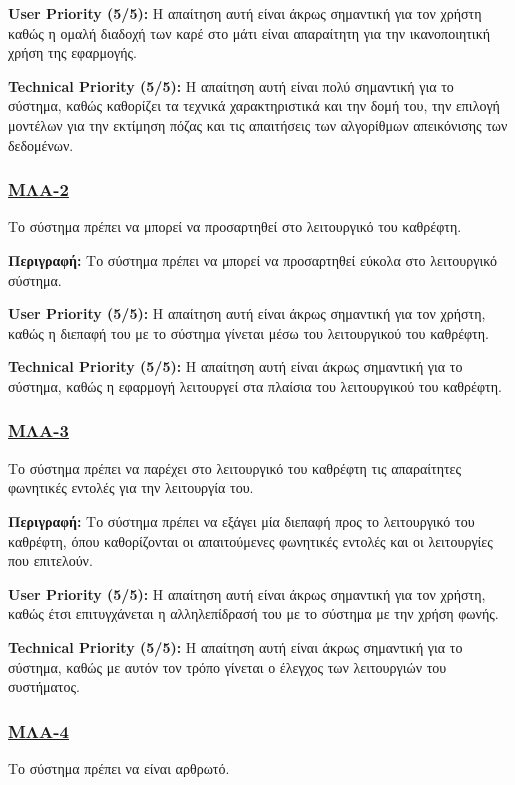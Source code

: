 \noindent\textbf{User Priority (5/5):} Η απαίτηση αυτή είναι άκρως σημαντική για τον χρήστη καθώς η ομαλή διαδοχή των καρέ στο μάτι είναι απαραίτητη για την ικανοποιητική χρήση της εφαρμογής.

\noindent\textbf{Technical Priority (5/5):} Η απαίτηση αυτή είναι πολύ σημαντική για το σύστημα, καθώς καθορίζει τα τεχνικά χαρακτηριστικά και την δομή του, την επιλογή μοντέλων για την εκτίμηση πόζας και τις απαιτήσεις των αλγορίθμων απεικόνισης των δεδομένων.

\subsubsection{\underline{ΜΛΑ-2}}
\noindent Το σύστημα πρέπει να μπορεί να προσαρτηθεί στο λειτουργικό του καθρέφτη.

\noindent\textbf{Περιγραφή:} Το σύστημα πρέπει να μπορεί να προσαρτηθεί εύκολα στο λειτουργικό σύστημα.

\noindent\textbf{User Priority (5/5):} Η απαίτηση αυτή είναι άκρως σημαντική για τον χρήστη, καθώς η διεπαφή του με το σύστημα γίνεται μέσω του λειτουργικού του καθρέφτη.

\noindent\textbf{Technical Priority (5/5):} Η απαίτηση αυτή είναι άκρως σημαντική για το σύστημα, καθώς η εφαρμογή λειτουργεί στα πλαίσια του λειτουργικού του καθρέφτη.


\subsubsection{\underline{ΜΛΑ-3}}
\noindent Το σύστημα πρέπει να παρέχει στο λειτουργικό του καθρέφτη τις απαραίτητες φωνητικές εντολές για την λειτουργία του.

\noindent\textbf{Περιγραφή:} Το σύστημα πρέπει να εξάγει μία διεπαφή προς το λειτουργικό του καθρέφτη, όπου καθορίζονται οι απαιτούμενες φωνητικές εντολές και οι λειτουργίες που επιτελούν.

\noindent\textbf{User Priority (5/5):} Η απαίτηση αυτή είναι άκρως σημαντική για τον χρήστη, καθώς έτσι επιτυγχάνεται η αλληλεπίδρασή του με το σύστημα με την χρήση φωνής.

\noindent\textbf{Technical Priority (5/5):} Η απαίτηση αυτή είναι άκρως σημαντική για το σύστημα, καθώς με αυτόν τον τρόπο γίνεται ο έλεγχος των λειτουργιών του συστήματος.


\subsubsection{\underline{ΜΛΑ-4}}
\noindent Το σύστημα πρέπει να είναι αρθρωτό.

